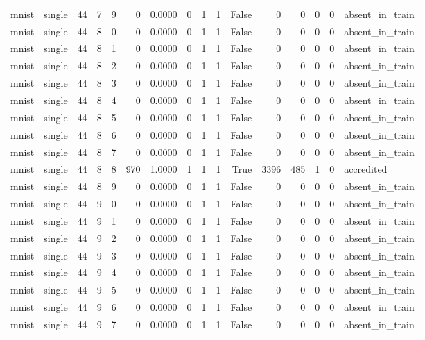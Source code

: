\begin{tabular}{llrrrrrrrrrrrrrl}
mnist & single & 44 & 7 & 9 & 0 & 0.0000 & 0 & 1 & 1 & False & 0 & 0 & 0 & 0 & absent\_in\_train \\
mnist & single & 44 & 8 & 0 & 0 & 0.0000 & 0 & 1 & 1 & False & 0 & 0 & 0 & 0 & absent\_in\_train \\
mnist & single & 44 & 8 & 1 & 0 & 0.0000 & 0 & 1 & 1 & False & 0 & 0 & 0 & 0 & absent\_in\_train \\
mnist & single & 44 & 8 & 2 & 0 & 0.0000 & 0 & 1 & 1 & False & 0 & 0 & 0 & 0 & absent\_in\_train \\
mnist & single & 44 & 8 & 3 & 0 & 0.0000 & 0 & 1 & 1 & False & 0 & 0 & 0 & 0 & absent\_in\_train \\
mnist & single & 44 & 8 & 4 & 0 & 0.0000 & 0 & 1 & 1 & False & 0 & 0 & 0 & 0 & absent\_in\_train \\
mnist & single & 44 & 8 & 5 & 0 & 0.0000 & 0 & 1 & 1 & False & 0 & 0 & 0 & 0 & absent\_in\_train \\
mnist & single & 44 & 8 & 6 & 0 & 0.0000 & 0 & 1 & 1 & False & 0 & 0 & 0 & 0 & absent\_in\_train \\
mnist & single & 44 & 8 & 7 & 0 & 0.0000 & 0 & 1 & 1 & False & 0 & 0 & 0 & 0 & absent\_in\_train \\
mnist & single & 44 & 8 & 8 & 970 & 1.0000 & 1 & 1 & 1 & True & 3396 & 485 & 1 & 0 & accredited \\
mnist & single & 44 & 8 & 9 & 0 & 0.0000 & 0 & 1 & 1 & False & 0 & 0 & 0 & 0 & absent\_in\_train \\
mnist & single & 44 & 9 & 0 & 0 & 0.0000 & 0 & 1 & 1 & False & 0 & 0 & 0 & 0 & absent\_in\_train \\
mnist & single & 44 & 9 & 1 & 0 & 0.0000 & 0 & 1 & 1 & False & 0 & 0 & 0 & 0 & absent\_in\_train \\
mnist & single & 44 & 9 & 2 & 0 & 0.0000 & 0 & 1 & 1 & False & 0 & 0 & 0 & 0 & absent\_in\_train \\
mnist & single & 44 & 9 & 3 & 0 & 0.0000 & 0 & 1 & 1 & False & 0 & 0 & 0 & 0 & absent\_in\_train \\
mnist & single & 44 & 9 & 4 & 0 & 0.0000 & 0 & 1 & 1 & False & 0 & 0 & 0 & 0 & absent\_in\_train \\
mnist & single & 44 & 9 & 5 & 0 & 0.0000 & 0 & 1 & 1 & False & 0 & 0 & 0 & 0 & absent\_in\_train \\
mnist & single & 44 & 9 & 6 & 0 & 0.0000 & 0 & 1 & 1 & False & 0 & 0 & 0 & 0 & absent\_in\_train \\
mnist & single & 44 & 9 & 7 & 0 & 0.0000 & 0 & 1 & 1 & False & 0 & 0 & 0 & 0 & absent\_in\_train \\

\end{tabular}
